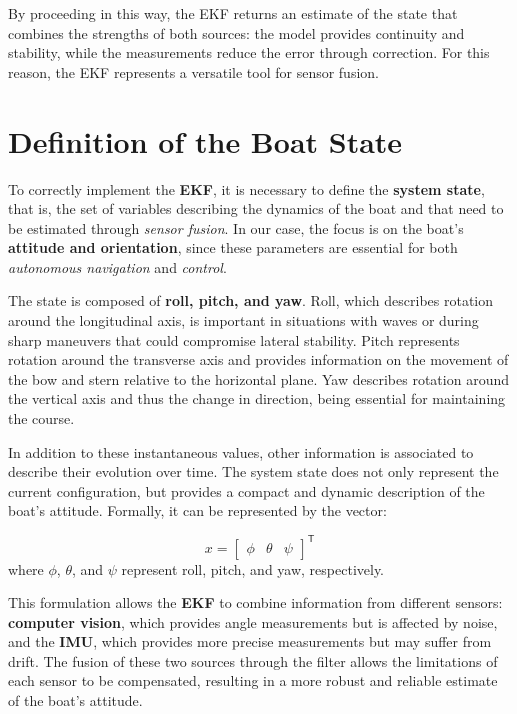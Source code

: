 By proceeding in this way, the EKF returns an estimate of the state that combines the strengths of both sources: the model provides continuity and stability, while the measurements reduce the error through correction. For this reason, the EKF represents a versatile tool for sensor fusion.

\section{Definition of the Boat State}

To correctly implement the \textbf{EKF}, it is necessary to define the \textbf{system state}, that is, the set of variables describing the dynamics of the boat and that need to be estimated through \textit{sensor fusion}. In our case, the focus is on the boat’s \textbf{attitude and orientation}, since these parameters are essential for both \textit{autonomous navigation} and \textit{control}.  

The state is composed of \textbf{roll, pitch, and yaw}. Roll, which describes rotation around the longitudinal axis, is important in situations with waves or during sharp maneuvers that could compromise lateral stability. Pitch represents rotation around the transverse axis and provides information on the movement of the bow and stern relative to the horizontal plane. Yaw describes rotation around the vertical axis and thus the change in direction, being essential for maintaining the course.  

In addition to these instantaneous values, other information is associated to describe their evolution over time. The system state does not only represent the current configuration, but provides a compact and dynamic description of the boat’s attitude. Formally, it can be represented by the vector:  

\[
x = 
\begin{bmatrix}
\phi & \theta & \psi
\end{bmatrix}^{\mathsf{T}}
\]
where \(\phi\), \(\theta\), and \(\psi\) represent roll, pitch, and yaw, respectively.  

This formulation allows the \textbf{EKF} to combine information from different sensors: \textbf{computer vision}, which provides angle measurements but is affected by noise, and the \textbf{IMU}, which provides more precise measurements but may suffer from drift. The fusion of these two sources through the filter allows the limitations of each sensor to be compensated, resulting in a more robust and reliable estimate of the boat’s attitude.

